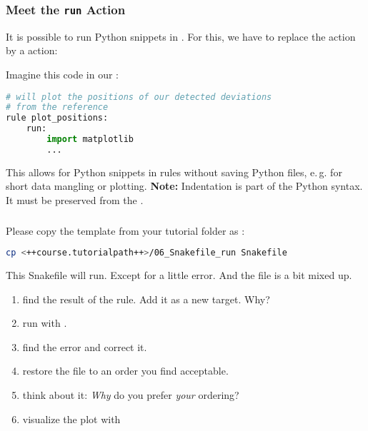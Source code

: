 \begin{frame}[fragile]
  \frametitle{Meet the \texttt{run} Action}
  \vspace{-0.5em}
  It is possible to run Python snippets in \Snakemake{}. For this, we have to replace the  action by a  action:\vspace{-0.5em}
  \begin{task}
  	Imagine this code in our :
  \end{task}\vspace{-0.5em}
  \begin{lstlisting}[language=Python,style=Python, basicstyle=\footnotesize]
# will plot the positions of our detected deviations
# from the reference
rule plot_positions:
    run:
        import matplotlib
        ...
  \end{lstlisting}
  \vspace{-0.5em}
  \pause\footnotesize
  \begin{hint}
     This allows for Python snippets in rules without saving Python files, e.\,g. for short data mangling or plotting.\newline
     \textbf{Note:} Indentation is part of the Python syntax. It must be preserved from the .
  \end{hint}
\end{frame}

\begin{frame}[fragile]
	\frametitle{}
	Please copy the  template from your tutorial folder as :
	\begin{lstlisting}[language=Bash, style=Shell]
cp <++course.tutorialpath++>/06_Snakefile_run Snakefile
    \end{lstlisting}
    \pause
    \begin{task}
    	This Snakefile will run. Except for a little error. And the file is a bit mixed up.
    	\begin{enumerate}
    		\item find the result of the  rule. Add it as a new target. Why?
    		\item run with .
    		\item find the error and correct it.
    		\item restore the file to an order you find acceptable.
    		\item think about it: \emph{Why} do you prefer \emph{your} ordering?
    		\item visualize the plot with 
    	\end{enumerate}
    \end{task}
\end{frame}

